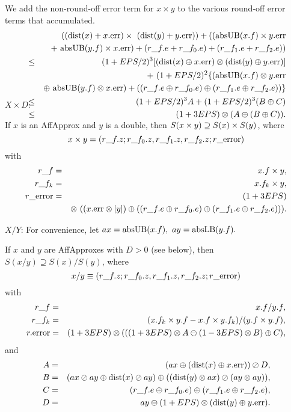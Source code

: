 We add the non-round-off error term for $x \times y$ to the various round-off error terms that accumulated.
\begin{eqnarray*}
&&\hskip-48pt (({\rm dist}(x) + x.{\rm err}) \times\ ({\rm dist}(y) + y.{\rm err})) +
 (({\rm absUB}(x.f) \times y.{\rm err} 
\\
&& +\ 
{\rm absUB}(y.f) \times x.{\rm err}) +
 (r\_f.e + r\_f_0.e) + (r\_f_1.e + r\_f_2.e))
\\
&\le& 
(1+EPS/2)^3[({\rm dist}(x) \oplus x.{\rm err})\otimes ({\rm dist}(y) \oplus y.{\rm err})]\\
&& +\
 (1+EPS/2)^2\{({\rm absUB}(x.f) \otimes y.{\rm err} 
\\
& &\oplus\ 
{\rm absUB}(y.f) \otimes x.{\rm err}) +
((r\_f.e \oplus r\_f_0.e) \oplus (r\_f_1.e \oplus r\_f_2.e))\}
\\
&\le& (1+EPS/2)^3 A + (1+EPS/2)^3 (B \oplus C) \\
&\le& (1+3EPS) \otimes (A \oplus (B \oplus C) ). \\
\noalign{\vskip-36pt}
\end{eqnarray*}
\enddemo

$X \times D$: 

 \hskip-8pt If $x$ is an 
AffApprox  and $y$ is a double{\rm ,} 
then $S(x \times y)\break \supseteq S(x) \times S(y)${\rm ,} where
$$x \times y = (r\_f.z; r\_f_0.z, r\_f_1.z, r\_f_2.z; r\_{\rm error})$$
with
\begin{eqnarray*}
r\_f& =& x.f \times y,\\
r\_f_k &=& x.f_k \times y,\\
r\_{\rm error} &=& (1+3EPS)\\
&& \otimes\ ( (x.{\rm err} \otimes |y|) \oplus
( (r\_f.e \oplus r\_f_0.e) \oplus (r\_f_1.e \oplus r\_f_2.e)) ).
\end{eqnarray*}
\endproclaim

$X/Y$: 
For convenience, let  $ax = {\rm absUB}(x.f),\ ay = {\rm absLB}(y.f).$ 
 
 If $x$ and $y$ are 
{\rm AffApproxes}  with $D > 0$ {\rm (}\/see below{\rm ),} then
$S(x / y) \supseteq S(x) / S(y)${\rm ,} where
$$x / y \equiv (r\_f.z; r\_f_0.z, r\_f_1.z, r\_f_2.z; r\_{\rm error})$$
with
\begin{eqnarray*}
r\_f &=& x.f / y.f,
\\
r\_f_k& =& (x.f_k \times y.f - x.f \times y.f_k)/ (y.f \times y.f),\\
r.{\rm error} & =& (1 + 3EPS) \otimes (
((1 + 3EPS) \otimes A \ominus (1 - 3EPS) \otimes B )\oplus C ),\end{eqnarray*}
and
\begin{eqnarray*}
A &=& (ax \oplus ({\rm dist}(x) \oplus x.{\rm err})) \oslash D,\\
B &=& (ax \oslash ay \oplus {\rm dist}(x) \oslash ay)
\oplus  (({\rm dist}(y) \otimes ax) \oslash (ay \otimes ay)),\\
C &=& (r\_f.e \oplus r\_f_0.e) \oplus (r\_f_1.e \oplus
r\_f_2.e),\\
D &=& ay \ominus (1 + EPS) \otimes ({\rm dist}(y) \oplus y.{\rm err}).
\end{eqnarray*}
\endproclaim

